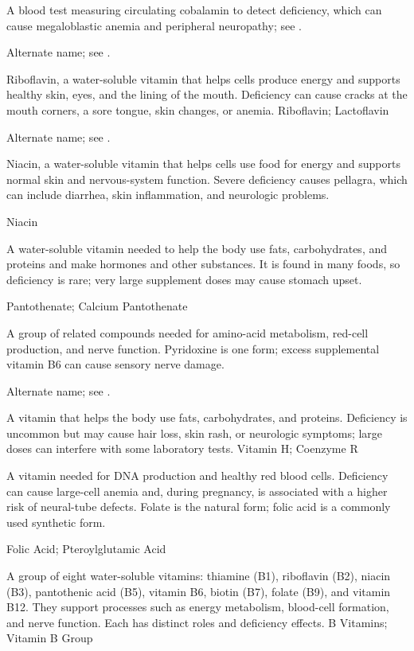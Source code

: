  A blood test measuring circulating cobalamin to detect deficiency, which can cause megaloblastic anemia and peripheral neuropathy; see .

 Alternate name; see .

 Riboflavin, a water-soluble vitamin that helps cells produce energy and supports healthy skin, eyes, and the lining of the mouth. Deficiency can cause cracks at the mouth corners, a sore tongue, skin changes, or anemia.
\synonyms
Riboflavin; Lactoflavin

 Alternate name; see .

 Niacin, a water-soluble vitamin that helps cells use food for energy and supports normal skin and nervous-system function. Severe deficiency causes pellagra, which can include diarrhea, skin inflammation, and neurologic problems.

\synonyms
Niacin

 A water-soluble vitamin needed to help the body use fats, carbohydrates, and proteins and make hormones and other substances. It is found in many foods, so deficiency is rare; very large supplement doses may cause stomach upset.

\synonyms
Pantothenate; Calcium Pantothenate

 A group of related compounds needed for amino-acid metabolism, red-cell production, and nerve function. Pyridoxine is one form; excess supplemental vitamin B6 can cause sensory nerve damage.

 Alternate name; see .

 A vitamin that helps the body use fats, carbohydrates, and proteins. Deficiency is uncommon but may cause hair loss, skin rash, or neurologic symptoms; large doses can interfere with some laboratory tests.
\synonyms
Vitamin H; Coenzyme R

 A vitamin needed for DNA production and healthy red blood cells. Deficiency can cause large-cell anemia and, during pregnancy, is associated with a higher risk of neural-tube defects. Folate is the natural form; folic acid is a commonly used synthetic form.

\synonyms
Folic Acid; Pteroylglutamic Acid

 A group of eight water-soluble vitamins: thiamine (B1), riboflavin (B2), niacin (B3), pantothenic acid (B5), vitamin B6, biotin (B7), folate (B9), and vitamin B12. They support processes such as energy metabolism, blood-cell formation, and nerve function. Each has distinct roles and deficiency effects.
\synonyms
B Vitamins; Vitamin B Group


